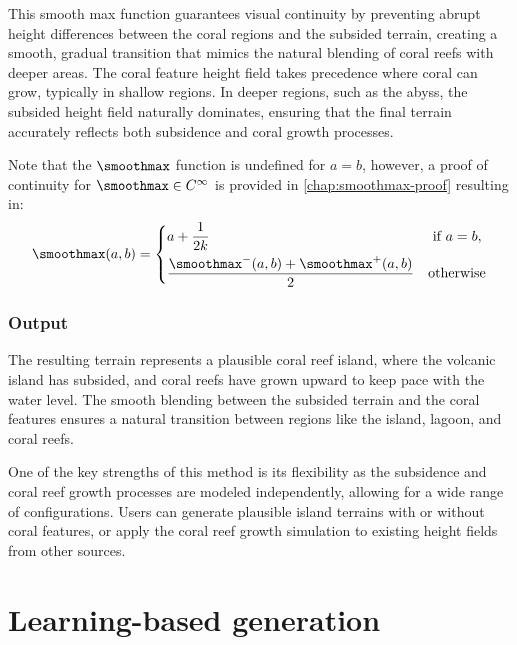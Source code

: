 This smooth max function guarantees visual continuity by preventing abrupt height differences between the coral regions and the subsided terrain, creating a smooth, gradual transition that mimics the natural blending of coral reefs with deeper areas. The coral feature height field takes precedence where coral can grow, typically in shallow regions. In deeper regions, such as the abyss, the subsided height field naturally dominates, ensuring that the final terrain accurately reflects both subsidence and coral growth processes.

Note that the $\smoothmax$ function is undefined for $a = b$, however, a proof of continuity for $\smoothmax \in C^\infty$ is provided in \cref{chap:smoothmax-proof} resulting in:
\begin{align}
    \smoothmax(a, b) = \begin{dcases}
        a + \frac{1}{2k} & \text{ if } a = b, \\
        \frac{\smoothmax^-(a, b) + \smoothmax^+(a, b)}{2} & \text{otherwise}
    \end{dcases}    
\end{align}

\subsubsection{Output}
\label{sec:coral-island_procedural-output}

The resulting terrain represents a plausible coral reef island, where the volcanic island has subsided, and coral reefs have grown upward to keep pace with the water level. The smooth blending between the subsided terrain and the coral features ensures a natural transition between regions like the island, lagoon, and coral reefs.

One of the key strengths of this method is its flexibility as the subsidence and coral reef growth processes are modeled independently, allowing for a wide range of configurations. Users can generate plausible island terrains with or without coral features, or apply the coral reef growth simulation to existing height fields from other sources.



\section{Learning-based generation}
\label{sec:coral-island_cGAN-training}

